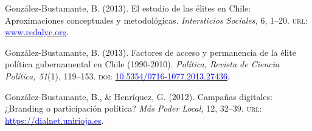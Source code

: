 \begin{publications}
\begin{benumerate}{14}
\item{\small González-Bustamante, B. (2013). El estudio de las élites en Chile: Aproximaciones conceptuales y metodológicas. {\itshape Intersticios Sociales,} 6, 1--20. {\scshape url:} \href{https://www.redalyc.org/articulo.oa?id=421739499004}{\textcolor{blue}{www.redalyc.org}}.} \vspace{1mm}

\item{\small González-Bustamante, B. (2013). Factores de acceso y permanencia de la élite política gubernamental en Chile (1990-2010). {\itshape Política, Revista de Ciencia Política, 51}(1), 119--153. {\scshape doi}: \href{https://doi.org/10.5354/0716-1077.2013.27436}{\textcolor{blue}{10.5354/0716-1077.2013.27436}}.} \vspace{1mm} %

\item{\small González-Bustamante, B., \& Henríquez, G. (2012). Campañas digitales: ¿Branding o participación política? {\itshape Más Poder Local,} 12, 32--39. {\scshape url:} \href{https://dialnet.unirioja.es/servlet/articulo?codigo=4013864}{\textcolor{blue}{https://dialnet.unirioja.es}}.} \vspace{1mm} %

\end{benumerate}

\end{publications}
